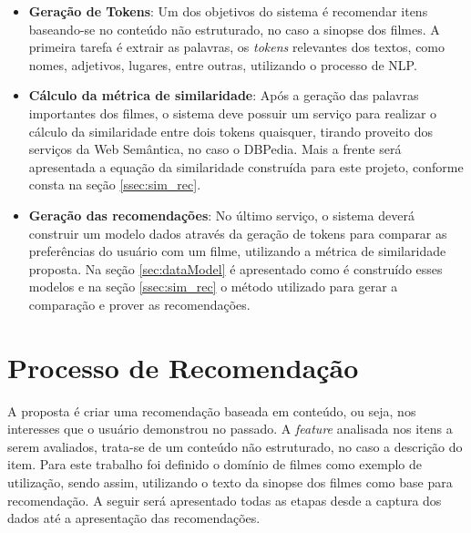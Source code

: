 \begin{itemize}
	\item{\textbf{Geração de Tokens}: Um dos objetivos do sistema é recomendar itens baseando-se no conteúdo não estruturado, no caso a sinopse dos filmes. A primeira tarefa é extrair as palavras, os \textit{tokens} relevantes dos textos, como nomes, adjetivos, lugares, entre outras, utilizando o processo de \ac{NLP}.}

	\item{\textbf{Cálculo da métrica de similaridade}: Após a geração das palavras importantes dos filmes, o sistema deve possuir um serviço para realizar o cálculo da similaridade entre dois tokens quaisquer, tirando proveito dos serviços da Web Semântica, no caso o DBPedia. Mais a frente será apresentada a equação da similaridade construída para este projeto, conforme consta na seção \ref{ssec:sim_rec}.}

	\item{\textbf{Geração das recomendações}: No último serviço, o sistema deverá construir um modelo dados através da geração de tokens para comparar as preferências do usuário com um filme, utilizando a métrica de similaridade proposta. Na seção \ref{sec:dataModel} é apresentado como é construído esses modelos e na seção \ref{ssec:sim_rec} o método utilizado para gerar a comparação e prover as recomendações.}
\end{itemize}

\section{Processo de Recomendação}

A proposta é criar uma recomendação baseada em conteúdo, ou seja, nos interesses que o usuário demonstrou no passado. A \textit{feature} analisada nos itens a serem avaliados, trata-se de um conteúdo não estruturado, no caso a descrição do item. Para este trabalho foi definido o domínio de filmes como exemplo de utilização, sendo assim, utilizando o texto da sinopse dos filmes como base para recomendação. A seguir será apresentado todas as etapas desde a captura dos dados até a apresentação das recomendações.

